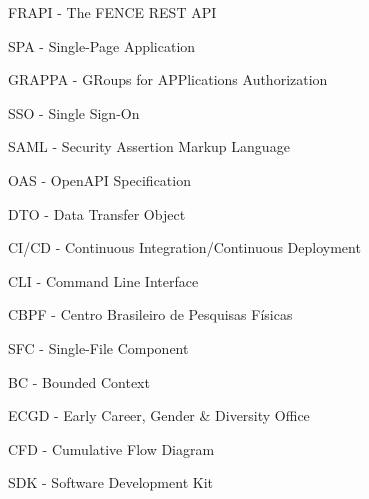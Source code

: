 \noindent FRAPI - The FENCE REST API

\noindent SPA - Single-Page Application

\noindent GRAPPA - GRoups for APPlications Authorization

\noindent SSO - Single Sign-On

\noindent SAML - Security Assertion Markup Language

\noindent OAS - OpenAPI Specification

\noindent DTO - Data Transfer Object

\noindent CI/CD - Continuous Integration/Continuous Deployment

\noindent CLI - Command Line Interface

\noindent CBPF - Centro Brasileiro de Pesquisas Físicas

\noindent SFC - Single-File Component

\noindent BC - Bounded Context

\noindent ECGD - Early Career, Gender \& Diversity Office

\noindent CFD - Cumulative Flow Diagram

\noindent SDK - Software Development Kit



\pagebreak







